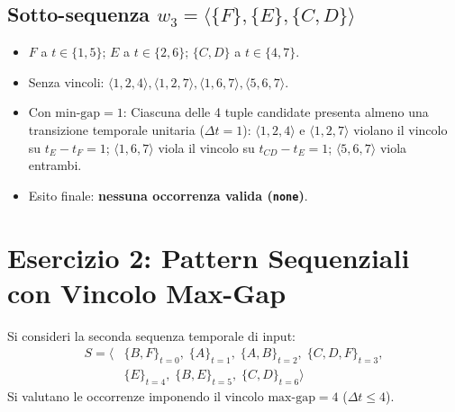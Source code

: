 \FloatBarrier
\subsection{Sotto-sequenza \texorpdfstring{$w_3 = \langle \{F\}, \{E\}, \{C, D\} \rangle$}{w3}}
\begin{itemize}
    \item $F$ a $t \in \{1, 5\}$; $E$ a $t \in \{2, 6\}$; $\{C, D\}$ a $t \in \{4, 7\}$.
    \item Senza vincoli: $\langle 1, 2, 4 \rangle, \langle 1, 2, 7 \rangle, \langle 1, 6, 7 \rangle, \langle 5, 6, 7 \rangle$.
    \item Con $\text{min-gap} = 1$:
    Ciascuna delle 4 tuple candidate presenta almeno una transizione temporale unitaria ($\Delta t = 1$):
    $\langle 1, 2, 4 \rangle$ e $\langle 1, 2, 7 \rangle$ violano il vincolo su $t_E - t_F = 1$; $\langle 1, 6, 7 \rangle$ viola il vincolo su $t_{CD} - t_E = 1$; $\langle 5, 6, 7 \rangle$ viola entrambi.
    \item Esito finale: \textbf{nessuna occorrenza valida (\texttt{none})}.
\end{itemize}

\FloatBarrier
\section{Esercizio 2: Pattern Sequenziali con Vincolo Max-Gap}
\label{sec:dm-seq-max-gap-exercise}

Si consideri la seconda sequenza temporale di input:
\begin{align}
S = \big\langle &\{B, F\}_{t=0}, \; \{A\}_{t=1}, \; \{A, B\}_{t=2}, \; \{C, D, F\}_{t=3}, \nonumber \\
&\{E\}_{t=4}, \; \{B, E\}_{t=5}, \; \{C, D\}_{t=6} \big\rangle
\end{align}
Si valutano le occorrenze imponendo il vincolo $\text{max-gap} = 4$ ($\Delta t \le 4$).

\FloatBarrier
